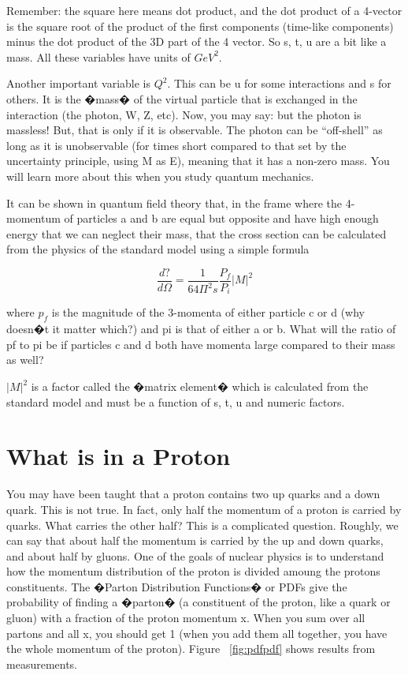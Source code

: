 Remember: the square here means dot product, and the dot product of a 4-vector is the square root of the product of the first components (time-like components) minus the dot product of the 3D part of the 4 vector.  So s, t, u are a bit like a mass.  All these variables have units of \(GeV^{2}\).

Another important variable is \(Q^{2}\).  This can be u for some interactions and s for others.  It is the �mass� of the virtual particle that is exchanged in the interaction (the photon, W, Z, etc).  
Now, you may say: but the photon is massless!  But, that is only if it is observable.  The photon can be ``off-shell'' as long as it is unobservable (for times short compared to that set by the uncertainty principle, using M as E), meaning that it has a non-zero mass.  You will learn more about this when you study quantum mechanics.

It can be shown in quantum field theory that, in the frame where the 4-momentum of particles a and b are equal but opposite and have high enough energy that we can neglect their mass, that the cross section can be calculated from the physics of the standard model using a simple formula

\begin{equation}
\frac{d?}{d\Omega} = \frac{1}{64\Pi^{2}s}\frac{P_{f}}{P_{i}}|M|^{2}
\end{equation}

where \(p_{f}\) is the magnitude of the 3-momenta of either particle c or d (why doesn�t it matter which?) and pi is that of either a or b.  What will the ratio of pf to pi be if particles c and d both have momenta large compared to their mass as well?

\(|M|^{2}\)  is a factor called the �matrix element� which is calculated from the standard model and must be a function of s, t, u and numeric factors.

\section{What is in a Proton}
You may have been taught that a proton contains two up quarks and a down quark.  This is not true.  In fact, only half the momentum of a proton is carried by quarks.  What carries the other half?  This is a complicated question.  Roughly, we can say that about half the momentum is carried by the up and down quarks, and about half by gluons.  One of the goals of nuclear physics is to understand how the momentum distribution of the proton is divided amoung the protons constituents.  The �Parton Distribution Functions� or PDFs give the probability of finding a �parton� (a constituent of the proton, like a quark or gluon) with a fraction of the proton momentum x.  When you sum over all partons and all x, you should get 1 (when you add them all together, you have the whole momentum of the proton).  Figure ~\ref{fig:pdfpdf} shows results from measurements.

